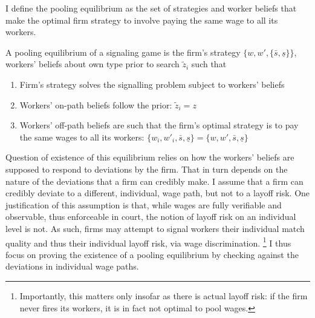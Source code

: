 I define the pooling equilibrium as the set of strategies and worker beliefs that make the optimal firm strategy to involve paying the same wage to all its workers. \\
\begin{definition}
    A pooling equilibrium of a signaling game is the firm's strategy $\{w,w', \{\bar{s},\underline{s}\}\}$, workers' beliefs about own type prior to search $\tilde{z}_{i}$ such that
    \begin{enumerate}
        \item Firm's strategy solves the signalling problem subject to workers' beliefs
        \item Workers' on-path beliefs follow the prior: $\tilde{z}_{i}=z$
        \item Workers' off-path beliefs are such that the firm's optimal strategy is to pay the same wages to all its workers: $\{w_{i},w'_i,\bar{s},\underline{s}\}=\{w,w',\bar{s},\underline{s}\}$
    \end{enumerate}
\end{definition}
Question of existence of this equilibrium relies on how the workers' beliefs are supposed to respond to deviations by the firm. That in turn depends on the nature of the deviations that a firm can credibly make. I assume that a firm can credibly deviate to a different, individual, wage path, but not to a layoff risk. One justification of this assumption is that, while wages are fully verifiable and observable, thus enforceable in court, the notion of layoff risk on an individual level is not. As such, firms may attempt to signal workers their individual match quality and thus their individual layoff risk, via wage discrimination. \footnote{Importantly, this matters only insofar as there is actual layoff risk: if the firm never fires its workers, it is in fact not optimal to pool wages.} I thus focus on proving the existence of a pooling equilibrium by checking against the deviations in individual wage paths.
